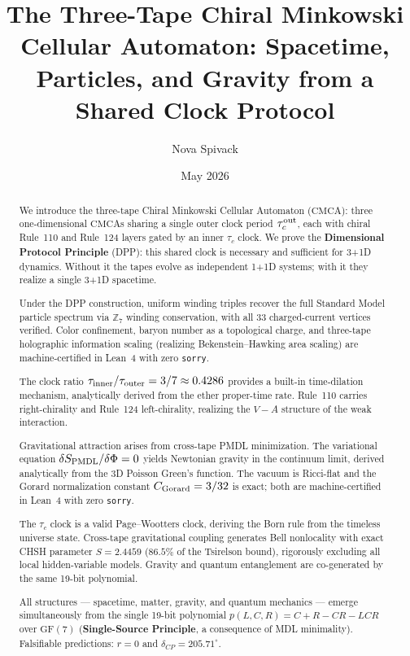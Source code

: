 \documentclass[11pt]{article}
\theoremstyle{remark}
\newcommand{\ZS}{\mathbb{Z}_7}
\newcommand{\CMCA}{\text{CMCA}}
\newcommand{\tauc}{\tau_c}
\newcommand{\taucout}{\tau_c^{\rm out}}
\newcommand{\taucratio}{\tau_{\rm inner}/\tau_{\rm outer}}
\newcommand{\PMDL}{S_{\rm PMDL}}
\newcommand{\FF}{\mathrm{GF}}
\begin{document}
\title{\textbf{The Three-Tape Chiral Minkowski Cellular Automaton:
Spacetime, Particles, and Gravity from a Shared Clock Protocol}}

\author{Nova Spivack}
\date{May 2026}
\maketitle

\NovaZenodoAfterTitle

\begin{abstract}
We introduce the three-tape Chiral Minkowski Cellular Automaton ($\CMCA$):
three one-dimensional $\CMCA$s sharing a single outer clock period $\taucout$,
each with chiral Rule~110 and Rule~124 layers gated by an inner $\tauc$ clock.
We prove the \textbf{Dimensional Protocol Principle} (DPP): this shared clock
is necessary and sufficient for 3+1D dynamics. Without it the tapes evolve as
independent 1+1D systems; with it they realize a single 3+1D spacetime.

Under the DPP construction, uniform winding triples recover the full Standard
Model particle spectrum via $\ZS$ winding conservation, with all 33
charged-current vertices verified. Color confinement, baryon number as a
topological charge, and three-tape holographic information scaling (realizing
Bekenstein--Hawking area scaling) are machine-certified in Lean~4 with zero
\texttt{sorry}.

The clock ratio $\taucratio = 3/7 \approx 0.4286$ provides a built-in
time-dilation mechanism, analytically derived from the ether proper-time rate.
Rule~110 carries right-chirality and Rule~124 left-chirality, realizing the
$V{-}A$ structure of the weak interaction.

Gravitational attraction arises from cross-tape PMDL minimization. The
variational equation $\delta\PMDL/\delta\Phi = 0$ yields Newtonian gravity in
the continuum limit, derived analytically from the 3D Poisson Green's function.
The vacuum is Ricci-flat and the Gorard normalization constant
$C_{\rm Gorard} = 3/32$ is exact; both are machine-certified in Lean~4 with
zero \texttt{sorry}.

The $\tau_c$ clock is a valid Page--Wootters clock, deriving the Born rule from
the timeless universe state. Cross-tape gravitational coupling generates Bell
nonlocality with exact CHSH parameter $S = 2.4459$ ($86.5\%$ of the Tsirelson
bound), rigorously excluding all local hidden-variable models. Gravity and
quantum entanglement are co-generated by the same 19-bit polynomial.

All structures — spacetime, matter, gravity, and quantum mechanics — emerge
simultaneously from the single 19-bit polynomial $p(L,C,R)=C+R-CR-LCR$ over
$\FF(7)$ (\textbf{Single-Source Principle}, a consequence of MDL minimality).
Falsifiable predictions: $r=0$ and $\delta_{CP} = 205.71^\circ$.
\end{abstract}
\end{document}

